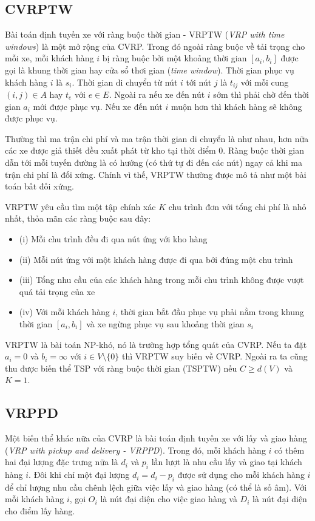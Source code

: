 \subsection{CVRPTW}
Bài toán định tuyến xe với ràng buộc thời gian - VRPTW (\textit{VRP with time windows}) là một mở rộng của CVRP. Trong đó ngoài ràng buộc về tải trọng cho mỗi xe, mỗi khách hàng $i$ bị ràng buộc bởi một khoảng thời gian $[a_i, b_i]$ được gọi là khung thời gian hay cửa sổ thơi gian (\textit{time window}). Thời gian phục vụ khách hàng $i$ là $s_i$. Thời gian di chuyển từ nút $i$ tới nút $j$ là $t_{ij}$ với mỗi cung $(i,j) \in A$ hay $t_e$ với $e \in E$. Ngoài ra nếu xe đến nút $i$ sớm thì phải chờ đến thời gian $a_i$ mới được phục vụ. Nếu xe đến nút $i$ muộn hơn thì khách hàng sẽ không được phục vụ.

Thường thì ma trận chi phí và ma trận thời gian di chuyển là như nhau, hơn nữa các xe được giả thiết đều xuất phát từ kho tại thời điểm $0$. Ràng buộc thời gian dẫn tới mỗi tuyến đường là có hướng (có thứ tự đi đến các nút) ngay cả khi ma trận chi phí là đối xứng. Chính vì thế, VRPTW thường được mô tả như một bài toán bất đối xứng.

VRPTW yêu cầu tìm một tập chính xác $K$ chu trình đơn với tổng chi phí là nhỏ nhất, thỏa mãn các ràng buộc sau đây:
\begin{itemize}
  \item[] (i) Mỗi chu trình đều đi qua nút ứng với kho hàng
  \item[] (ii) Mỗi nút ứng với một khách hàng được đi qua bởi đúng một chu trình
  \item[] (iii) Tổng nhu cầu của các khách hàng trong mỗi chu trình không được vượt quá tải trọng của xe
  \item[] (iv) Với mỗi khách hàng $i$, thời gian bắt đầu phục vụ phải nằm trong khung thời gian $[a_i, b_i]$ và xe ngừng phục vụ sau khoảng thời gian $s_i$
\end{itemize}

VRPTW là bài toán NP-khó, nó là trường hợp tổng quát của CVRP. Nếu ta đặt $a_i=0$ và $b_i=\infty$ với $i \in V \setminus \{0\}$ thì VRPTW suy biến về CVRP. Ngoài ra ta cũng thu được biến thể TSP với ràng buộc thời gian (TSPTW) nếu $C \geq d(V)$ và $K=1$.

\subsection{VRPPD}
Một biến thể khác nữa của CVRP là bài toán định tuyến xe với lấy và giao hàng (\textit{VRP with pickup and delivery - VRPPD}). Trong đó, mỗi khách hàng $i$ có thêm hai đại lượng đặc trưng nữa là $d_i$ và $p_i$ lần lượt là nhu cầu lấy và giao tại khách hàng $i$. Đôi khi chỉ một đại lượng $d_i = d_i - p_i$ được sử dụng cho mỗi khách hàng $i$ để chỉ lượng nhu cầu chênh lệch giữa việc lấy và giao hàng (có thể là số âm). Với mỗi khách hàng $i$, gọi $O_i$ là nút đại diện cho việc giao hàng và $D_i$ là nút đại diện cho điểm lấy hàng. 

